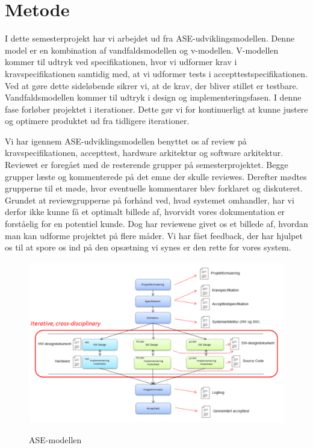 \section{Metode}
I dette semesterprojekt har vi arbejdet ud fra ASE-udviklingsmodellen. Denne model er en kombination af vandfaldsmodellen og v-modellen. V-modellen kommer til udtryk ved specifikationen, hvor vi udformer krav i kravspecifikationen samtidig med, at vi udformer tests i accepttestspecifikationen. Ved at gøre dette sideløbende sikrer vi, at de krav, der bliver stillet er testbare. Vandfaldsmodellen kommer til udtryk i design og implementeringsfasen. I denne fase forløber projektet i iterationer. Dette gør vi for kontinuerligt at kunne justere og optimere produktet ud fra tidligere iterationer. 
 
Vi har igennem ASE-udviklingsmodellen benyttet os af review på kravspecifikationen, accepttest, hardware arkitektur og software arkitektur. Reviewet er foregået med de resterende grupper på semesterprojektet. Begge grupper læste og kommenterede på det emne der skulle reviewes. Derefter mødtes grupperne til et møde, hvor eventuelle kommentarer blev forklaret og diskuteret. Grundet at reviewgrupperne på forhånd ved, hvad systemet omhandler, har vi derfor ikke kunne få et optimalt billede af, hvorvidt vores dokumentation er forståelig for en potentiel kunde. Dog har reviewene givet os et billede af, hvordan man kan udforme projektet på flere måder. Vi har fået feedback, der har hjulpet os til at spore os ind på den opsætning vi synes er den rette for vores system.   

	\begin{figure}[h!]
	\centering
	\includegraphics[width=0.8\linewidth]{Udviklingsproces/ASEmodellen}
	\label{fig:ase-modellen}
	\caption{ASE-modellen \cite{ASE}}
\end{figure}

